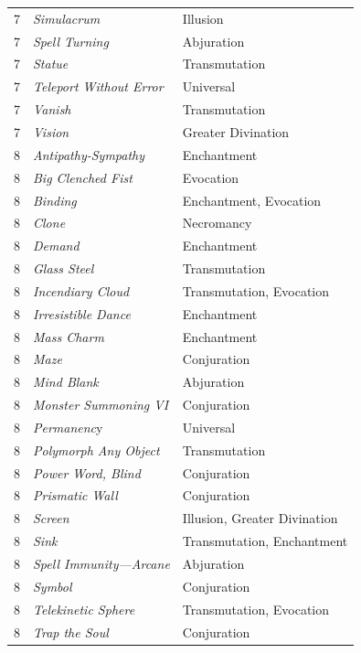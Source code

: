 \begin{multicols}{2}
\begin{tabular}{|p{}|p{}|p{}|}
\rowcolor[gray]{.9}7	& \textit{Simulacrum}	& Illusion \\
7	& \textit{Spell Turning}	& Abjuration \\
\rowcolor[gray]{.9}7	& \textit{Statue}	& Transmutation \\
7	& \textit{Teleport Without Error}	& Universal \\
\rowcolor[gray]{.9}7	& \textit{Vanish}	& Transmutation \\
7	& \textit{Vision}	& Greater Divination \\
\rowcolor[gray]{.9}8	& \textit{Antipathy-Sympathy}	& Enchantment \\
8	& \textit{Big Clenched Fist}	& Evocation \\
\rowcolor[gray]{.9}8	& \textit{Binding}	& Enchantment, Evocation \\
8	& \textit{Clone}	& Necromancy \\
\rowcolor[gray]{.9}8	& \textit{Demand}	& Enchantment \\
8	& \textit{Glass Steel}	& Transmutation \\
\rowcolor[gray]{.9}8	& \textit{Incendiary Cloud}	& Transmutation, Evocation \\
8	& \textit{Irresistible Dance}	& Enchantment \\
\rowcolor[gray]{.9}8	& \textit{Mass Charm}	& Enchantment \\
8	& \textit{Maze}	& Conjuration \\
\rowcolor[gray]{.9}8	& \textit{Mind Blank}	& Abjuration \\
8	& \textit{Monster Summoning VI}	& Conjuration \\
\rowcolor[gray]{.9}8	& \textit{Permanenc}y	& Universal \\
8	& \textit{Polymorph Any Object}	& Transmutation \\
\rowcolor[gray]{.9}8	& \textit{Power Word, Blind}	& Conjuration \\
8	& \textit{Prismatic Wall}	& Conjuration \\
\rowcolor[gray]{.9}8	& \textit{Screen}	& Illusion, Greater Divination \\
8	& \textit{Sink}	& Transmutation, Enchantment \\
\rowcolor[gray]{.9}8	& \textit{Spell Immunity---Arcane}	& Abjuration \\
8	& \textit{Symbol}	& Conjuration \\
\rowcolor[gray]{.9}8	& \textit{Telekinetic Sphere}	& Transmutation, Evocation \\
8	& \textit{Trap the Soul}	& Conjuration \\

\end{tabular}
\end{multicols}
